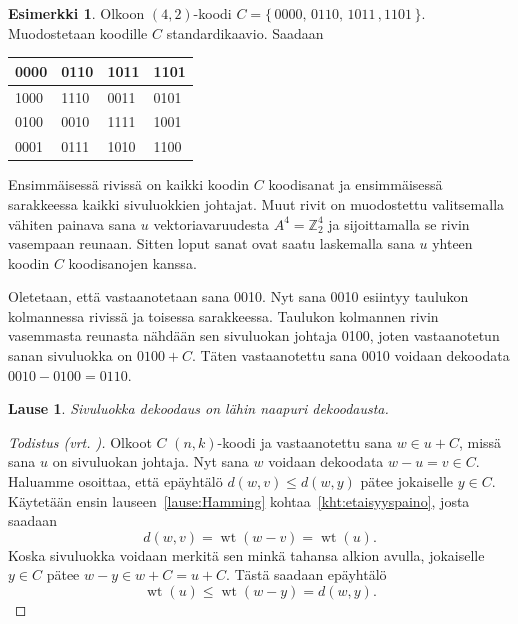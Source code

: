 \documentclass[a4paper,12pt,leqno,oneside]{report} %
\theoremstyle{plain}
\newtheorem{lause}{Lause}[chapter]
\theoremstyle{plain}
\theoremstyle{definition}
\newtheorem{esimerkki}{Esimerkki}[chapter]
\DeclareMathOperator{\wt}{wt}
\theoremstyle{remark}
\numberwithin{equation}{chapter}
\newcommand*{\Zset}{\mathbb{Z}}  %
\begin{document}
    \begin{esimerkki}\label{esim:stdmatrix}
        Olkoon $(4,2)$-koodi $C = \{\,0000,\, 0110,\, 1011\,,1101\,\}$. Muodostetaan koodille $C$ standardikaavio. Saadaan
        \begin{center}
            \begin{tabular}{llll}
                0000 & 0110 & 1011 & 1101 \\ \midrule
                1000 & 1110 & 0011 & 0101 \\
                0100 & 0010 & 1111 & 1001 \\
                0001 & 0111 & 1010 & 1100
            \end{tabular}
        \end{center}
        Ensimmäisessä rivissä on kaikki koodin $C$ koodisanat ja ensimmäisessä sarakkeessa kaikki sivuluokkien johtajat. Muut rivit on muodostettu valitsemalla vähiten painava sana $u$ vektoriavaruudesta $A^4 = \Zset_2^4$ ja sijoittamalla se rivin vasempaan reunaan. Sitten loput sanat ovat saatu laskemalla sana $u$ yhteen koodin $C$ koodisanojen kanssa.

        Oletetaan, että vastaanotetaan sana 0010. Nyt sana 0010 esiintyy taulukon kolmannessa rivissä ja toisessa sarakkeessa. Taulukon kolmannen rivin vasemmasta reunasta nähdään sen sivuluokan johtaja 0100, joten vastaanotetun sanan sivuluokka on $0100 + C$. Täten vastaanotettu sana 0010 voidaan dekoodata $0010 - 0100 = 0110$.
    \end{esimerkki}

    \begin{lause}\label{lause:nnstdarr}
        Sivuluokka dekoodaus on lähin naapuri dekoodausta.
    \end{lause}

    \begin{proof}[Todistus \upshape(vrt. {\cite[s.~496]{PA}})]\label{tod:nnstdarr}
        Olkoot $C$ $(n,k)$-koodi ja vastaanotettu sana $w \in u + C$, missä sana $u$ on sivuluokan johtaja. Nyt sana $w$ voidaan dekoodata $w - u = v \in C$. Haluamme osoittaa, että epäyhtälö $d(w,v) \le d(w, y)$ pätee jokaiselle $y \in C$. Käytetään ensin lauseen~\ref{lause:Hamming} kohtaa~\ref{kht:etaisyyspaino}, josta saadaan
        \[
            d(w,v) = \wt(w-v) = \wt(u). %
        \]
        Koska sivuluokka voidaan merkitä sen minkä tahansa alkion avulla, jokaiselle $y \in C$ pätee $w - y \in w + C = u + C$. Tästä saadaan epäyhtälö
        \[\wt(u) \le \wt(w-y) = d(w,y).\]
    \end{proof}
\end{document}
